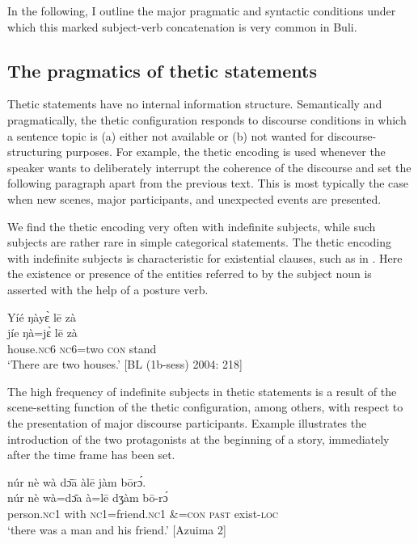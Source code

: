 \documentclass[output=paper]{langsci/langscibook}
\begin{document}
In the following, I outline the major pragmatic and syntactic conditions under which this marked subject-verb concatenation is very common in Buli.

\subsection{The pragmatics of thetic statements}\label{sec:schwarz:3.4}

Thetic statements have no internal information structure. Semantically and pragmatically, the thetic configuration responds to discourse conditions in which a sentence topic is (a) either not available or (b) not wanted for discourse-structuring purposes. For example, the thetic encoding is used whenever the speaker wants to deliberately interrupt the coherence of the discourse and set the following paragraph apart from the previous text. This is most typically the case when new scenes, major participants, and unexpected events are presented. 

We find the thetic encoding very often with indefinite subjects, while such subjects are rather rare in simple categorical statements. The thetic encoding with indefinite subjects is characteristic for existential clauses, such as in . Here the existence or presence of the entities referred to by the subject noun is asserted with the help of a posture verb.

\ea\label{ex:schwarz:20}
\glll   Yíé    ŋày\`{ɛ}    l\={e}  zà\\
    \textup{jíe}    ŋà=j\`ɛ    l\={e}  {zà} \\
       house.\textsc{nc}6  \textsc{nc}6=two  \textsc{con}  stand\\
\glt ‘There are two houses.’ [BL (1b-sess) 2004: 218]
\z

The high frequency of indefinite subjects in thetic statements is a result of the scene-setting function of the thetic configuration, among others, with respect to the presentation of major discourse participants. Example  illustrates the introduction of the two protagonists at the beginning of a story, immediately after the time frame has been set. 

\ea\label{ex:schwarz:21}
\glll   núr    nè  {wà   d\={ɔ}\={a}}    àl\={e}    jàm  b\={o}r{ɔ́}.\\
    \textup{núr}   nè wà=\textup{d\={ɔ}a}      à=l\={e}    dʒàm  b\={o}-rɔ́\\
       person.\textsc{nc}1  with  \textsc{nc}1=friend.\textsc{nc}1  \&=\textsc{con}  \textsc{past}  exist-\textsc{loc}\\
\glt ‘there was a man and his friend.’ [Azuima 2]
\z
\end{document}
